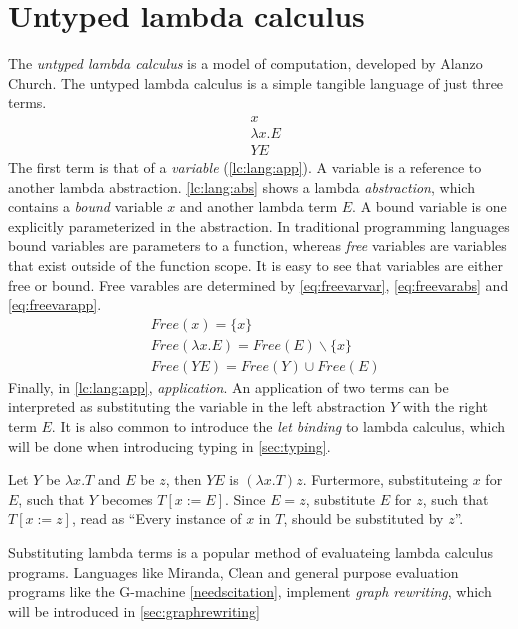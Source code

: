 \documentclass[11pt,oneside,a4paper]{report}
\begin{document}
\clearpage
\section{Untyped lambda calculus}\label{sec:lc}
The \textit{untyped lambda calculus} is a model of computation, developed by Alanzo Church\cite{church1936unsolvable}.
The untyped lambda calculus is a simple tangible language of just three terms.
\begin{align}
  &x
  \label{lc:lang:var}\\
  &\lambda x . E
  \label{lc:lang:abs}\\
  &Y E
  \label{lc:lang:app}
\end{align}
The first term is that of a \textit{variable} (\autoref{lc:lang:app}).
A variable is a reference to another lambda abstraction.
\autoref{lc:lang:abs} shows a lambda \textit{abstraction}, which contains a \textit{bound} variable $x$ and another lambda term $E$.
A bound variable is one explicitly parameterized in the abstraction.
In traditional programming languages bound variables are parameters to a function, whereas \textit{free} variables are variables that exist outside of the function scope.
It is easy to see that variables are either free or bound.
Free varables are determined by \autoref{eq:freevarvar}, \autoref{eq:freevarabs} and \autoref{eq:freevarapp}.
\begin{align}
    \label{eq:freevarvar}
    &Free(x) = \{ x \}\\
    \label{eq:freevarabs}
    &Free(\lambda x . E) = Free(E) \backslash \{ x \}\\
    \label{eq:freevarapp}
    &Free(Y E) = Free(Y) \cup Free(E)
\end{align}
Finally, in \autoref{lc:lang:app}, \textit{application}.
An application of two terms can be interpreted as substituting the variable in the left abstraction $Y$ with the right term $E$.
It is also common to introduce the \textit{let binding} to lambda calculus, which will be done when introducing typing in \autoref{sec:typing}.

\begin{exmp}
\label{ex:application}
Let $Y$ be $\lambda x . T$ and $E$ be $z$, then $Y E$ is $(\lambda x . T) z$.
Furtermore, substituteing $x$ for $E$, such that $Y$ becomes $T[x := E]$.
Since $E = z$, substitute $E$ for $z$, such that $T[x := z]$, read as ``Every instance of $x$ in $T$, should be substituted by $z$''.
\end{exmp}
\begin{remark}
Substituting lambda terms is a popular method of evaluateing lambda calculus programs.
    Languages like Miranda, Clean and general purpose evaluation programs like the G-machine \autoref{needscitation}, implement \textit{graph rewriting}, which will be introduced in \autoref{sec:graphrewriting}
\end{remark}
\end{document}
